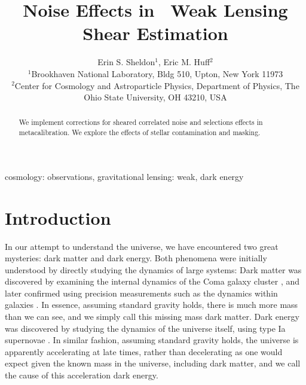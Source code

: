 \documentclass[a4paper,fleqn,usenatbib]{mnras}
\title{Noise Effects in \Mcal\ Weak Lensing Shear Estimation}
\author[Sheldon et al.]{Erin S. Sheldon$^1$, Eric M. Huff$^2$\\
$^1$Brookhaven National Laboratory, Bldg 510, Upton, New York 11973\\
$^2$Center for Cosmology and Astroparticle Physics, Department of Physics, The Ohio State University, OH 43210, USA }
\newcommand{\mcal}{metacalibration}
\begin{document}
\maketitle

\begin{abstract}

We implement corrections for sheared correlated noise and selections effects in
\mcal. We explore the effects of stellar contamination and masking.   

\end{abstract}


\begin{keywords}                                                                    
    cosmology: observations,
    gravitational lensing: weak,
    dark energy
\end{keywords} 

\section{Introduction} \label{sec:intro}

In our attempt to understand the universe, we have encountered two great
mysteries: dark matter and dark energy.  Both phenomena were initially
understood by directly studying the dynamics of large systems:  Dark matter was
discovered by examining the internal dynamics of the Coma galaxy cluster
\citep{Zwicky33,Zwicky37}, and later confirmed using precision measurements such as the
dynamics within galaxies \citep{Rubin1978a,Rubin1980}.  In essence, assuming
standard gravity holds, there is much more mass than we can see, and we simply
call this missing mass dark matter.  Dark energy was discovered by studying the
dynamics of the universe itself, using type Ia supernovae
\citep{Riess98,Perlmutter99}.  In similar fashion, assuming standard gravity
holds, the universe is apparently accelerating at late times, rather than
decelerating as one would expect given the known mass in the universe,
including dark matter, and we call the cause of this acceleration dark energy.
\end{document}
